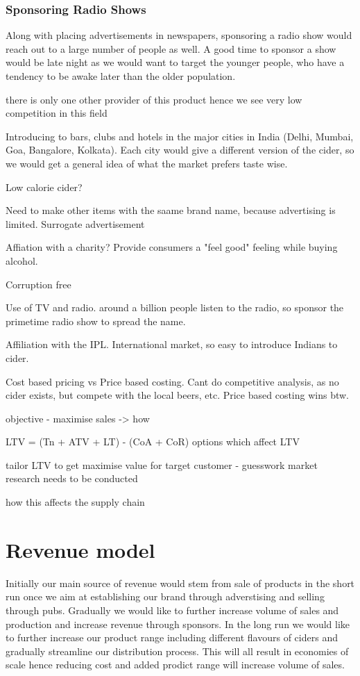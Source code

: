 \documentclass{article}
\begin{document}
\subsubsection{Sponsoring Radio Shows}
Along with placing advertisements in newspapers, sponsoring a radio show would reach
out to a large number of people as well. A good time to sponsor a show would be
late night as we would want to target the younger people, who have a tendency to
be awake later than the older population.
\newpage

there is only one other provider of this product hence we see very low competition in this field

Introducing to bars, clubs and hotels in the major cities in India (Delhi, Mumbai, Goa,
Bangalore, Kolkata). Each city would give a different version of the cider, so we would
get a general idea of what the market prefers taste wise.

Low calorie cider?

Need to make other items with the saame brand name, because advertising is limited. Surrogate advertisement

Affiation with a charity? Provide consumers a "feel good" feeling while buying alcohol.

Corruption free

Use of TV and radio. around a billion people listen to the radio, so sponsor the primetime radio
show to spread the name.

Affiliation with the IPL. International market, so easy to introduce Indians to cider.

Cost based pricing vs Price based costing. Cant do competitive analysis, as no cider exists, but compete with
the local beers, etc. Price based costing wins btw.

objective - maximise sales -> how

LTV = (Tn + ATV + LT) - (CoA + CoR)
options which affect LTV

tailor LTV to get maximise value for target customer - guesswork market research
needs to be conducted

how this affects the supply chain
\section{Revenue model}

Initially our main source of revenue would stem from sale of products in the short run once we aim at establishing our brand through adverstising and selling through pubs. Gradually we would like to further increase volume of sales and production and increase revenue through sponsors. In the long run we would like to further increase our product range including different flavours of ciders and gradually streamline our distribution process. This will all result in economies of scale hence reducing cost and added prodict range will increase volume of sales.
\end{document}

